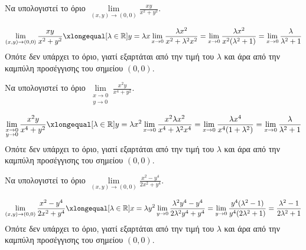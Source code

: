\documentclass[a4paper,11pt]{report}
\begin{document}
  \begin{example}
    Να υπολογιστεί το όριο $ \lim\limits_{(x,y)\to (0, 0)} \frac{xy}{x^{2}+y^{2}} $.
    \begin{solution}
      \[
        \lim\limits_{(x,y)\to (0, 0)} \frac{xy}{x^{2}+y^{2}} 
        \xlongequal[\lambda \in \mathbb{R}]{y= \lambda x} \lim_{x \to 0}
        \frac{\lambda x^{2}}{x^{2}+ \lambda^{2} x^{2}} = \lim_{x \to 0} 
        \frac{\lambda x^{2}}{x^{2}(\lambda ^{2}+1)} = \lim_{x \to 0} 
        \frac{\lambda}{\lambda ^{2}+1} 
      \]
      Οπότε δεν υπάρχει το όριο, γιατί εξαρτάται από την τιμή του 
      $ \lambda $ και άρα από την καμπύλη προσέγγισης του σημείου 
      $ (0,0) $.
    \end{solution}
  \end{example}

  \begin{example}
    Να υπολογιστεί το όριο $ \lim\limits_{\substack{x\to 0 \\y \to 0}} 
    \frac{x^{2}y}{x^{4}+y^{2}} $.
    \begin{solution}
      \[
        \lim\limits_{\substack{x\to 0 \\y \to 0}} 
        \frac{x^{2}y}{x^{4}+y^{2}} 
        \xlongequal[\lambda \in \mathbb{R}]{y= \lambda x^{2}} 
        \lim_{x \to 0} \frac{x^{2} \lambda x^{2}}
        {x^{4}+\lambda^{2}x^{4}} = \lim_{x\to 0} 
        \frac{\lambda x^{4}}{x^{4}(1+\lambda ^{2})} = 
        \lim_{x \to 0} \frac{\lambda}{\lambda ^{2}+1} 
      \] 
      Οπότε δεν υπάρχει το όριο, γιατί εξαρτάται από την τιμή του $ \lambda $ 
      και άρα από την καμπύλη προσέγγισης του σημείου $ (0,0) $.
    \end{solution}
  \end{example}

  \begin{example}
    Να υπολογιστεί το όριο $ \lim\limits_{(x,y)\to (0, 0)} \frac{x^{2}-y^{4}}
    {2x^{2}+y^{4}} $. 
    \begin{solution}
      \[
        \lim\limits_{(x,y)\to (0, 0)} \frac{x^{2}-y^{4}}
        {2x^{2}+y^{4}} \xlongequal[\lambda \in \mathbb{R}]
        {x= \lambda y^{2}} \lim_{y \to 0} 
        \frac{\lambda ^{2}y^{4}-y^{4}}{2 \lambda ^{2}y^{4}+y^{4}} = 
        \lim_{y \to 0} \frac{y^{4}(\lambda ^{2}-1)}
        {y^{4}(2 \lambda ^{2}+1)} = 
        \frac{\lambda ^{2}-1}{2 \lambda ^{2}+1} 
      \] 
      Οπότε δεν υπάρχει το όριο, γιατί εξαρτάται από την τιμή του $ \lambda $ 
      και άρα από την καμπύλη προσέγγισης του σημείου $ (0,0) $.
    \end{solution}
  \end{example}
\end{document}
